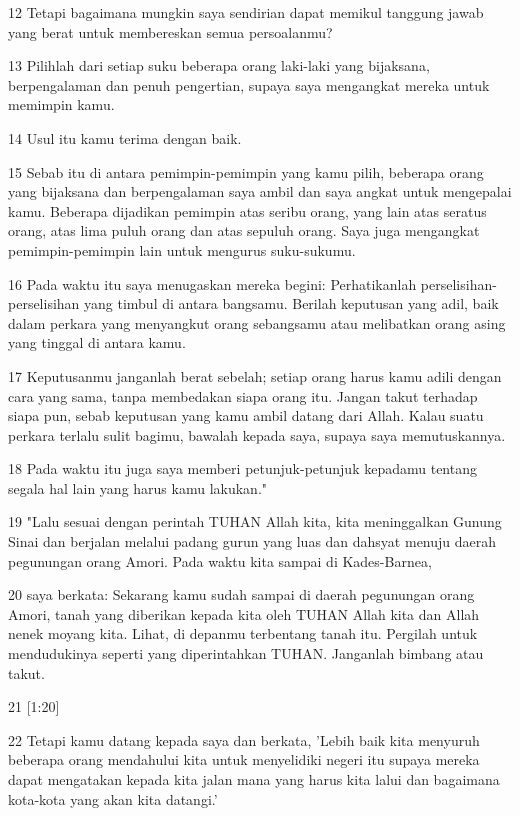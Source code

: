 \par 12 Tetapi bagaimana mungkin saya sendirian dapat memikul tanggung jawab yang berat untuk membereskan semua persoalanmu?
\par 13 Pilihlah dari setiap suku beberapa orang laki-laki yang bijaksana, berpengalaman dan penuh pengertian, supaya saya mengangkat mereka untuk memimpin kamu.
\par 14 Usul itu kamu terima dengan baik.
\par 15 Sebab itu di antara pemimpin-pemimpin yang kamu pilih, beberapa orang yang bijaksana dan berpengalaman saya ambil dan saya angkat untuk mengepalai kamu. Beberapa dijadikan pemimpin atas seribu orang, yang lain atas seratus orang, atas lima puluh orang dan atas sepuluh orang. Saya juga mengangkat pemimpin-pemimpin lain untuk mengurus suku-sukumu.
\par 16 Pada waktu itu saya menugaskan mereka begini: Perhatikanlah perselisihan-perselisihan yang timbul di antara bangsamu. Berilah keputusan yang adil, baik dalam perkara yang menyangkut orang sebangsamu atau melibatkan orang asing yang tinggal di antara kamu.
\par 17 Keputusanmu janganlah berat sebelah; setiap orang harus kamu adili dengan cara yang sama, tanpa membedakan siapa orang itu. Jangan takut terhadap siapa pun, sebab keputusan yang kamu ambil datang dari Allah. Kalau suatu perkara terlalu sulit bagimu, bawalah kepada saya, supaya saya memutuskannya.
\par 18 Pada waktu itu juga saya memberi petunjuk-petunjuk kepadamu tentang segala hal lain yang harus kamu lakukan."
\par 19 "Lalu sesuai dengan perintah TUHAN Allah kita, kita meninggalkan Gunung Sinai dan berjalan melalui padang gurun yang luas dan dahsyat menuju daerah pegunungan orang Amori. Pada waktu kita sampai di Kades-Barnea,
\par 20 saya berkata: Sekarang kamu sudah sampai di daerah pegunungan orang Amori, tanah yang diberikan kepada kita oleh TUHAN Allah kita dan Allah nenek moyang kita. Lihat, di depanmu terbentang tanah itu. Pergilah untuk mendudukinya seperti yang diperintahkan TUHAN. Janganlah bimbang atau takut.
\par 21 [1:20]
\par 22 Tetapi kamu datang kepada saya dan berkata, 'Lebih baik kita menyuruh beberapa orang mendahului kita untuk menyelidiki negeri itu supaya mereka dapat mengatakan kepada kita jalan mana yang harus kita lalui dan bagaimana kota-kota yang akan kita datangi.'
